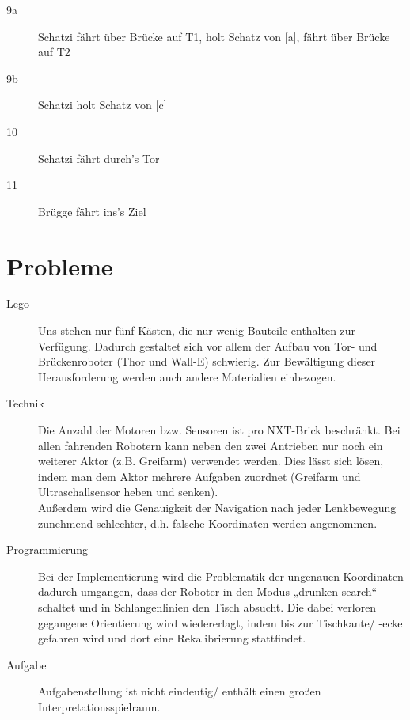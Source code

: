 \documentclass[a4paper]{scrartcl}
\begin{document}
\begin{description}
		\item[9a] Schatzi fährt über Brücke auf T1, holt Schatz von [a], fährt über Brücke auf T2
		\item[9b] Schatzi holt Schatz von [c]

		\item[10] Schatzi fährt durch's Tor

		\item[11] Brügge fährt ins's Ziel
	\end{description}

	\section{Probleme}
	\begin{description}
		\item[Lego] Uns stehen nur fünf Kästen, die nur wenig Bauteile enthalten zur Verfügung. Dadurch gestaltet sich vor allem der Aufbau von Tor- und Brückenroboter (Thor und Wall-E) schwierig. Zur Bewältigung dieser Herausforderung werden auch andere Materialien einbezogen.
		\item[Technik] Die Anzahl der Motoren bzw. Sensoren ist pro NXT-Brick beschränkt. Bei allen fahrenden Robotern kann neben den zwei Antrieben nur noch ein weiterer Aktor (z.B. Greifarm) verwendet werden. Dies lässt sich lösen, indem man dem Aktor mehrere Aufgaben zuordnet (Greifarm und Ultraschallsensor heben und senken). \\
			Außerdem wird die Genauigkeit der Navigation nach jeder Lenkbewegung zunehmend schlechter, d.h. falsche Koordinaten werden angenommen.
		\item[Programmierung] Bei der Implementierung wird die Problematik der ungenauen Koordinaten dadurch umgangen, dass der Roboter in den Modus „drunken search“ schaltet und in Schlangenlinien den Tisch absucht. Die dabei verloren gegangene Orientierung wird wiedererlagt, indem bis zur Tischkante/ -ecke gefahren wird und dort eine Rekalibrierung stattfindet.
		\item[Aufgabe] Aufgabenstellung ist nicht eindeutig/ enthält einen großen Interpretationsspielraum. 
	\end{description}
\end{document}
